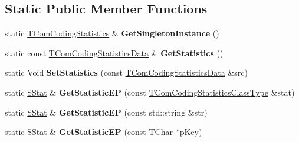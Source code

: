 \subsection*{Static Public Member Functions}
\begin{DoxyCompactItemize}
\item 
\mbox{\label{class_t_com_coding_statistics_acbe368218ff802d9d819e58a37c88f6b}} 
static \hyperlink{class_t_com_coding_statistics}{T\+Com\+Coding\+Statistics} \& {\bfseries Get\+Singleton\+Instance} ()
\item 
\mbox{\label{class_t_com_coding_statistics_ab4dbc7969f0dc896c4f7acb94bd57801}} 
static const \hyperlink{class_t_com_coding_statistics_1_1_t_com_coding_statistics_data}{T\+Com\+Coding\+Statistics\+Data} \& {\bfseries Get\+Statistics} ()
\item 
\mbox{\label{class_t_com_coding_statistics_ace9a8aeffdbe3bb7464f03a5e8f37de2}} 
static Void {\bfseries Set\+Statistics} (const \hyperlink{class_t_com_coding_statistics_1_1_t_com_coding_statistics_data}{T\+Com\+Coding\+Statistics\+Data} \&src)
\item 
\mbox{\label{class_t_com_coding_statistics_a18359de64debe180ed4983c7f8e5d387}} 
static \hyperlink{struct_t_com_coding_statistics_1_1_s_stat}{S\+Stat} \& {\bfseries Get\+Statistic\+EP} (const \hyperlink{class_t_com_coding_statistics_class_type}{T\+Com\+Coding\+Statistics\+Class\+Type} \&stat)
\item 
\mbox{\label{class_t_com_coding_statistics_a79a0b08efddbaf64417789cebd3d566e}} 
static \hyperlink{struct_t_com_coding_statistics_1_1_s_stat}{S\+Stat} \& {\bfseries Get\+Statistic\+EP} (const std\+::string \&str)
\item 
\mbox{\label{class_t_com_coding_statistics_a99833b93c0df9821b5113880656c3781}} 
static \hyperlink{struct_t_com_coding_statistics_1_1_s_stat}{S\+Stat} \& {\bfseries Get\+Statistic\+EP} (const T\+Char $\ast$p\+Key)
\item 
\mbox{\label{class_t_com_coding_statistics_a8b731c68a5e199e8844824172382ec2c}} 

\end{DoxyCompactItemize}
